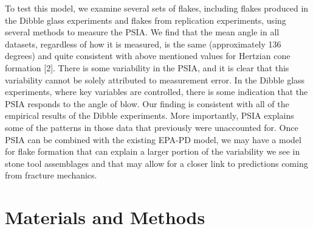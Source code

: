 \documentclass[10pt,letterpaper]{article}
\begin{document}
To test this model, we examine several sets of flakes, including flakes
produced in the Dibble glass experiments and flakes from replication
experiments, using several methods to measure the PSIA. We find that the
mean angle in all datasets, regardless of how it is measured, is the
same (approximately 136 degrees) and quite consistent with above
mentioned values for Hertzian cone formation {[}2{]}. There is some
variability in the PSIA, and it is clear that this variability cannot be
solely attributed to measurement error. In the Dibble glass experiments,
where key variables are controlled, there is some indication that the
PSIA responds to the angle of blow. Our finding is consistent with all
of the empirical results of the Dibble experiments. More importantly,
PSIA explains some of the patterns in those data that previously were
unaccounted for. Once PSIA can be combined with the existing EPA-PD
model, we may have a model for flake formation that can explain a larger
portion of the variability we see in stone tool assemblages and that may
allow for a closer link to predictions coming from fracture mechanics.

\hypertarget{materials-and-methods}{%
\section{Materials and Methods}\label{materials-and-methods}}
\end{document}
